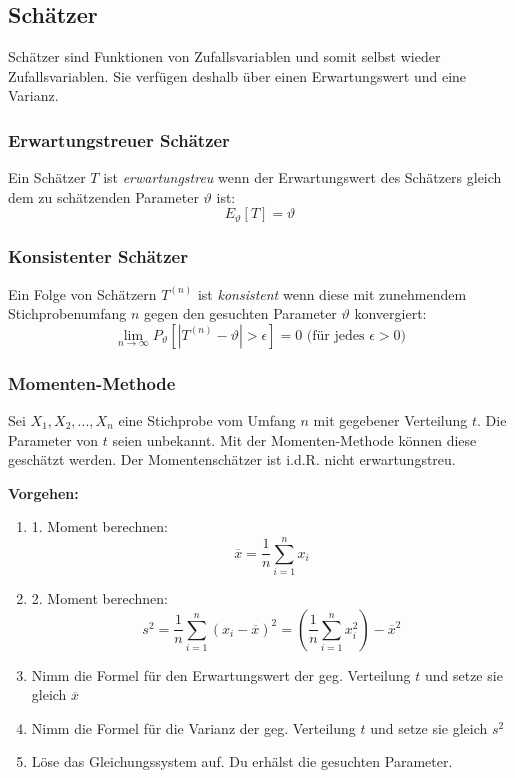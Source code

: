 \documentclass[10pt,a4paper,twocolumn]{article}
\begin{document}
\subsection{Schätzer}
Schätzer sind Funktionen von Zufallsvariablen und somit selbst wieder Zufallsvariablen. Sie verfügen deshalb über einen Erwartungswert und eine Varianz.

\subsubsection{Erwartungstreuer Schätzer}
Ein Schätzer $T$ ist \emph{erwartungstreu} wenn der Erwartungswert des Schätzers gleich dem zu schätzenden Parameter $\vartheta$ ist:
\[
E_\vartheta [T] = \vartheta
\]

\subsubsection{Konsistenter Schätzer}
Ein Folge von Schätzern $T^{(n)}$ ist \emph{konsistent} wenn diese mit zunehmendem Stichprobenumfang $n$ gegen den gesuchten Parameter $\vartheta$ konvergiert:
\[
\lim_{n\to\infty}P_{\vartheta}\left[|T^{(n)}-\vartheta| > \epsilon\right] = 0\text{ (für jedes $\epsilon > 0$)}
\]

\subsubsection{Momenten-Methode}
Sei $X_1,X_2,...,X_n$ eine Stichprobe vom Umfang $n$ mit gegebener Verteilung $t$. Die Parameter von $t$ seien unbekannt. Mit der Momenten-Methode können diese geschätzt werden. Der Momentenschätzer ist i.d.R. nicht erwartungstreu.

\vspace{10pt}

\textbf{Vorgehen:}
\begin{enumerate}
\item 1. Moment berechnen:
\[
\overline{x} = \frac{1}{n}\sum\limits_{i=1}^{n}x_i
\]
\item 2. Moment berechnen:
\[
s^2 = \frac{1}{n}\sum\limits_{i=1}^{n}\left(x_i - \overline{x}\right)^2=\left( \frac{1}{n}\sum\limits_{i=1}^{n}x_i^2\right)-\overline{x}^2
\]
\item Nimm die Formel für den Erwartungswert der geg. Verteilung $t$ und setze sie gleich $\overline{x}$
\item Nimm die Formel für die Varianz der geg. Verteilung $t$ und setze sie gleich $s^2$
\item Löse das Gleichungssystem auf. Du erhälst die gesuchten Parameter.
\end{enumerate}
\end{document}
